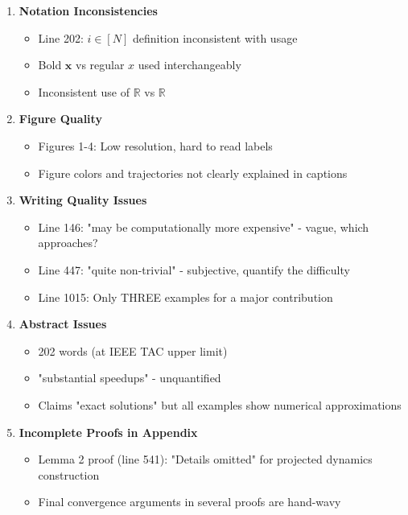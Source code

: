 \documentclass[journal,twoside,web]{ieeecolor}
\newcommand{\real}{\mathbb{R}}
\begin{document}
\begin{enumerate}[resume]

\item \textbf{Notation Inconsistencies}
\begin{itemize}
\item Line 202: $i\in[N]$ definition inconsistent with usage
\item Bold $\mathbf{x}$ vs regular $x$ used interchangeably
\item Inconsistent use of $\mathbb{R}$ vs $\real$
\end{itemize}

\item \textbf{Figure Quality}
\begin{itemize}
\item Figures 1-4: Low resolution, hard to read labels
\item Figure colors and trajectories not clearly explained in captions
\end{itemize}

\item \textbf{Writing Quality Issues}
\begin{itemize}
\item Line 146: "may be computationally more expensive" - vague, which approaches?
\item Line 447: "quite non-trivial" - subjective, quantify the difficulty
\item Line 1015: Only THREE examples for a major contribution
\end{itemize}

\item \textbf{Abstract Issues}
\begin{itemize}
\item 202 words (at IEEE TAC upper limit)
\item "substantial speedups" - unquantified
\item Claims "exact solutions" but all examples show numerical approximations
\end{itemize}

\item \textbf{Incomplete Proofs in Appendix}
\begin{itemize}
\item Lemma 2 proof (line 541): "Details omitted" for projected dynamics construction
\item Final convergence arguments in several proofs are hand-wavy
\end{itemize}

\end{enumerate}
\end{document}
